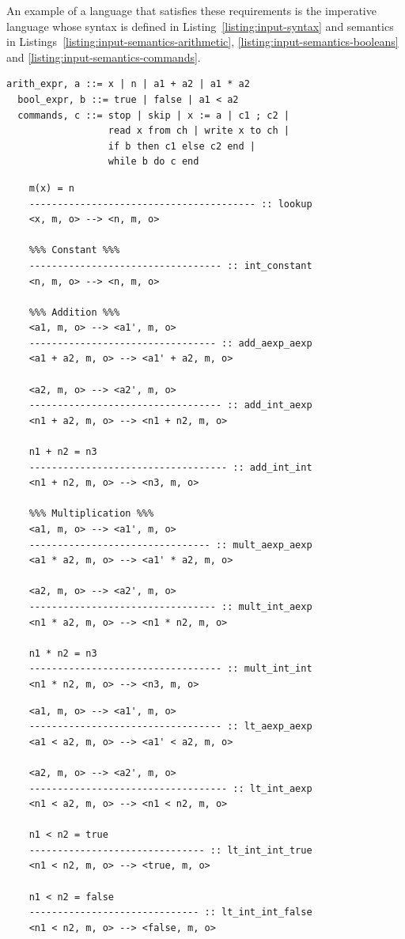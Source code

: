 \documentclass[conference]{IEEEtran}
\begin{document}
An example of a language that satisfies these requirements is the imperative language whose syntax is defined in Listing~\ref{listing:input-syntax} and semantics in Listings~\ref{listing:input-semantics-arithmetic}, \ref{listing:input-semantics-booleans} and \ref{listing:input-semantics-commands}.

\begin{lstlisting}[label=listing:input-syntax,captionpos=b,caption=Ott syntax of a simple imperative language]
  arith_expr, a ::= x | n | a1 + a2 | a1 * a2 
  bool_expr, b ::= true | false | a1 < a2
  commands, c ::= stop | skip | x := a | c1 ; c2 | 
                  read x from ch | write x to ch |
                  if b then c1 else c2 end | 
                  while b do c end

\end{lstlisting}

\begin{lstlisting}[label=listing:input-semantics-arithmetic,captionpos=b,caption=Ott small-step semantics of arithmetic expressions]
	%%% Variable %%%
	m(x) = n
	---------------------------------------- :: lookup
	<x, m, o> --> <n, m, o>

	%%% Constant %%%
	---------------------------------- :: int_constant
	<n, m, o> --> <n, m, o>
	
	%%% Addition %%%
	<a1, m, o> --> <a1', m, o>
	--------------------------------- :: add_aexp_aexp
	<a1 + a2, m, o> --> <a1' + a2, m, o>
	
	<a2, m, o> --> <a2', m, o>
	---------------------------------- :: add_int_aexp
	<n1 + a2, m, o> --> <n1 + n2, m, o>
	
	n1 + n2 = n3
	----------------------------------- :: add_int_int
	<n1 + n2, m, o> --> <n3, m, o>
	
	%%% Multiplication %%%
	<a1, m, o> --> <a1', m, o>
	-------------------------------- :: mult_aexp_aexp
	<a1 * a2, m, o> --> <a1' * a2, m, o>
	
	<a2, m, o> --> <a2', m, o>
	--------------------------------- :: mult_int_aexp
	<n1 * a2, m, o> --> <n1 * n2, m, o>
	
	n1 * n2 = n3
	---------------------------------- :: mult_int_int
	<n1 * n2, m, o> --> <n3, m, o>
\end{lstlisting}
\pagebreak
\begin{lstlisting}[label=listing:input-semantics-booleans,captionpos=b,caption=Ott small-step semantics of boolean expressions]
	%%% Lower Than %%%
	<a1, m, o> --> <a1', m, o>
	---------------------------------- :: lt_aexp_aexp
	<a1 < a2, m, o> --> <a1' < a2, m, o>
	
	<a2, m, o> --> <a2', m, o>
	----------------------------------- :: lt_int_aexp
	<n1 < a2, m, o> --> <n1 < n2, m, o>
	
	n1 < n2 = true
	------------------------------- :: lt_int_int_true
	<n1 < n2, m, o> --> <true, m, o>
	
	n1 < n2 = false
	------------------------------ :: lt_int_int_false
	<n1 < n2, m, o> --> <false, m, o>
\end{lstlisting}
\end{document}
